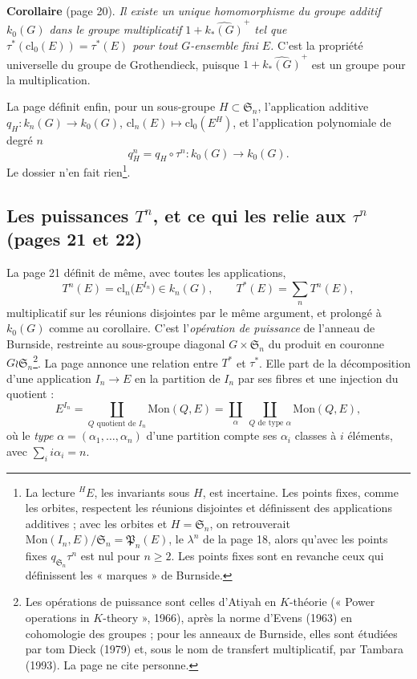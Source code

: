 \documentclass[11pt,a4paper]{article}
\begin{document}
\textbf{Corollaire} (page 20). \emph{Il existe un unique homomorphisme du
groupe additif $k_0(G)$ dans le groupe multiplicatif
$1 + \widehat{k_{*}(G)}^{+}$ tel que $\tau^{*}(\mathrm{cl}_0(E)) =
\tau^{*}(E)$ pour tout $G$-ensemble fini $E$.} C'est la propriété
universelle du groupe de Grothendieck, puisque $1 + \widehat{k_{*}(G)}^{+}$
est un groupe pour la multiplication.

La page définit enfin, pour un sous-groupe $H \subset \mathfrak{S}_n$,
l'application additive $q_H \colon k_n(G) \to k_0(G)$,
$\mathrm{cl}_n(E) \mapsto \mathrm{cl}_0(E^{H})$, et l'application
polynomiale de degré $n$
\[
q^{n}_H = q_H \circ \tau^{n} \colon k_0(G) \longrightarrow k_0(G).
\]
Le dossier n'en fait rien\footnote{La lecture ${}^{H}\!E$, les invariants
sous $H$, est incertaine. Les points fixes, comme les orbites, respectent
les réunions disjointes et définissent des applications additives ; avec
les orbites et $H = \mathfrak{S}_n$, on retrouverait
$\mathrm{Mon}(I_n, E)/\mathfrak{S}_n = \mathfrak{P}_n(E)$, le $\lambda^{n}$
de la page 18, alors qu'avec les points fixes $q_{\mathfrak{S}_n}\tau^{n}$
est nul pour $n \geqslant 2$. Les points fixes sont en revanche ceux qui
définissent les « marques » de Burnside.}.

\subsection*{Les puissances $T^{n}$, et ce qui les relie aux $\tau^{n}$ (pages 21 et 22)}

La page 21 définit de même, avec toutes les applications,
\[
T^{n}(E) = \mathrm{cl}_n\bigl(E^{I_n}\bigr) \in k_n(G), \qquad
T^{*}(E) = \sum_n T^{n}(E),
\]
multiplicatif sur les réunions disjointes par le même argument, et prolongé
à $k_0(G)$ comme au corollaire. C'est l'\emph{opération de puissance} de
l'anneau de Burnside, restreinte au sous-groupe diagonal $G \times
\mathfrak{S}_n$ du produit en couronne $G \wr \mathfrak{S}_n$\footnote{Les
opérations de puissance sont celles d'Atiyah en $K$-théorie (« Power
operations in $K$-theory », 1966), après la norme d'Evens (1963) en
cohomologie des groupes ; pour les anneaux de Burnside, elles sont étudiées
par tom Dieck (1979) et, sous le nom de transfert multiplicatif, par Tambara
(1993). La page ne cite personne.}. La page annonce une relation entre
$T^{*}$ et $\tau^{*}$. Elle part de la décomposition d'une application
$I_n \to E$ en la partition de $I_n$ par ses fibres et une injection du
quotient :
\[
E^{I_n} = \coprod_{Q \text{ quotient de } I_n} \mathrm{Mon}(Q, E) =
\coprod_{\alpha} \ \coprod_{Q \text{ de type } \alpha} \mathrm{Mon}(Q, E),
\]
où le \emph{type} $\alpha = (\alpha_1, \dots, \alpha_n)$ d'une partition
compte ses $\alpha_i$ classes à $i$ éléments, avec $\sum_i i\alpha_i = n$.
\end{document}
